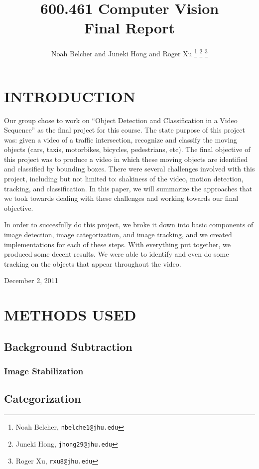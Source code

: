\documentclass[a4paper, 10pt, conference]{ieeeconf}      %
\title{\LARGE \bf
600.461 Computer Vision\\Final Report
}
\author{Noah Belcher and Juneki Hong and Roger Xu%
\thanks{Noah Belcher,
        {\tt\small nbelche1@jhu.edu}}%
\thanks{Juneki Hong,
        {\tt\small jhong29@jhu.edu}}%
\thanks{Roger Xu,
		{\tt\small rxu8@jhu.edu}}%
}
\begin{document}
\maketitle
\thispagestyle{empty}
\pagestyle{empty}


\section{INTRODUCTION}

Our group chose to work on “Object Detection and Classification in a Video Sequence” as the final project for this course. The state purpose of this project was: given a video of a traffic intersection, recognize and classify the moving objects (cars, taxis, motorbikes, bicycles, pedestrians, etc). The final objective of this project was to produce a video in which these moving objects are identified and classified by bounding boxes. There were several challenges involved with this project, including but not limited to: shakiness of the video, motion detection, tracking, and classification. In this paper, we will summarize the approaches that we took towards dealing with these challenges and working towards our final objective. \newline


In order to succesfully do this project, we broke it down into basic components of image detection, image categorization, and image tracking, and we created implementations for each of these steps. With everything put together, we produced some decent results. We were able to identify and even do some tracking on the objects that appear throughout the video. 


\hfill December 2, 2011


\section{METHODS USED}

\subsection{Background Subtraction}

\subsubsection{Image Stabilization}

\subsection{Categorization}
\end{document}
